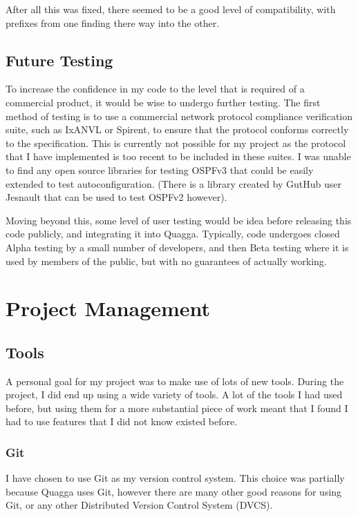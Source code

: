 \documentclass[12pt]{report}
\begin{document}
After all this was fixed, there seemed to be a good level of compatibility,
with prefixes from one finding there way into the other.

\section{Future Testing}
To increase the confidence in my code to the level that is required of a
commercial product, it would be wise to undergo further testing. The first
method of testing is to use a commercial network protocol compliance
verification suite, such as IxANVL or Spirent, to ensure that the protocol
conforms correctly to the specification. This is currently not possible for my
project as the protocol that I have implemented is too recent to be included in
these suites. I was unable to find any open source libraries for testing OSPFv3
that could be easily extended to test autoconfiguration. (There is a library
created by GutHub user Jesnault that can be used to test OSPFv2 however).

Moving beyond this, some level of user testing would be idea before releasing
this code publicly, and integrating it into Quagga. Typically, code undergoes
closed Alpha testing by a small number of developers, and then Beta testing
where it is used by members of the public, but with no guarantees of actually
working.

\chapter{Project Management}

\section{Tools}
A personal goal for my project was to make use of lots of new tools. During the
project, I did end up using a wide variety of tools. A lot of the tools I had
used before, but using them for a more substantial piece of work meant that I
found I had to use features that I did not know existed before.

\subsection{Git}
I have chosen to use Git as my version control system. This choice was
partially because Quagga uses Git, however there are many other good reasons for
using Git, or any other Distributed Version Control System (DVCS).
\end{document}
